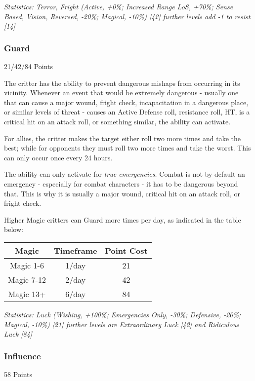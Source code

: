 \begin{multicols*}{3}
	\textcolor{OliveGreen}{\textit{Statistics: Terror, Fright (Active, +0\%; Increased Range LoS, +70\%; Sense Based, Vision, Reversed, -20\%; Magical, -10\%) [42] further levels add -1 to resist [14]
	}}
	
	
	\subsubsection{Guard}\label{guard}
	\begin{flushright}
		21/42/84 Points
	\end{flushright}
	
	The critter has the ability to prevent dangerous mishaps from occurring in its vicinity. Whenever an event that would be extremely dangerous - usually one that can cause a major wound, fright check, incapacitation in a dangerous place, or similar levels of threat - causes an Active Defense roll, resistance roll, HT, is a critical hit on an attack roll, or something similar, the ability can activate.
	
	For allies, the critter makes the target either roll two more times and take the best; while for opponents they must roll two more times and take the worst. This can only occur once every 24 hours.
	
	The ability can only activate for \textit{true emergencies.} Combat is not by default an emergency - especially for combat characters - it has to be dangerous beyond that. This is why it is usually a major wound, critical hit on an attack roll, or fright check.
	
	Higher Magic critters can Guard more times per day, as indicated in the table below:
	
	\begin{center}
		\begin{tabular}{|c|c|c|}
			\hline
			Magic & Timeframe & Point Cost\\
			\hline
			\hline
			Magic 1-6 & 1/day & 21 \\
			Magic 7-12 & 2/day & 42 \\
			Magic 13+ & 6/day & 84 \\
			\hline
		\end{tabular}
	\end{center}
	
	\textcolor{OliveGreen}{\textit{Statistics: Luck (Wishing, +100\%; Emergencies Only, -30\%; Defensive, -20\%; Magical, -10\%) [21] further levels are Extraordinary Luck [42] and Ridiculous Luck [84]}}
	
	
	\subsubsection{Influence}\label{influence}
	\begin{flushright}
		58 Points
	\end{flushright}
	

\end{multicols*}
